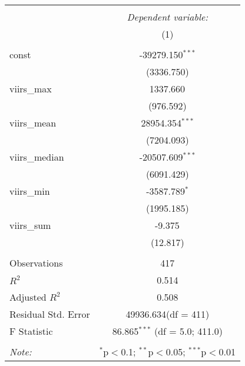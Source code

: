 \begin{table}[!htbp] \centering
\begin{tabular}{@{\extracolsep{5pt}}lc}
\\[-1.8ex]\hline
\hline \\[-1.8ex]
& \multicolumn{1}{c}{\textit{Dependent variable:}} \
\cr \cline{1-2}
\\[-1.8ex] & (1) \\
\hline \\[-1.8ex]
 const & -39279.150$^{***}$ \\
  & (3336.750) \\
 viirs_max & 1337.660$^{}$ \\
  & (976.592) \\
 viirs_mean & 28954.354$^{***}$ \\
  & (7204.093) \\
 viirs_median & -20507.609$^{***}$ \\
  & (6091.429) \\
 viirs_min & -3587.789$^{*}$ \\
  & (1995.185) \\
 viirs_sum & -9.375$^{}$ \\
  & (12.817) \\
\hline \\[-1.8ex]
 Observations & 417 \\
 $R^2$ & 0.514 \\
 Adjusted $R^2$ & 0.508 \\
 Residual Std. Error & 49936.634(df = 411)  \\
 F Statistic & 86.865$^{***}$ (df = 5.0; 411.0) \\
\hline
\hline \\[-1.8ex]
\textit{Note:} & \multicolumn{1}{r}{$^{*}$p$<$0.1; $^{**}$p$<$0.05; $^{***}$p$<$0.01} \\
\end{tabular}
\end{table}